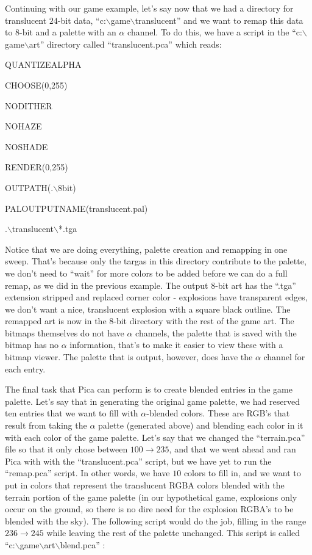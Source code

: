 Continuing with our game example, let's say now that we had a directory for translucent
$24$-bit data, ``c:$\backslash$game$\backslash$translucent'' and we want to remap this data 
to $8$-bit and a palette with an $\alpha$ channel. To do this, we have a script in the 
``c:$\backslash$game$\backslash$art'' directory called ``translucent.pca'' which reads:


QUANTIZEALPHA


CHOOSE(0,255)


NODITHER


NOHAZE


NOSHADE


RENDER(0,255)


OUTPATH(.$\backslash$8bit)


PALOUTPUTNAME(translucent.pal)


.$\backslash$translucent$\backslash$*.tga


\newpar Notice that we are doing everything, palette creation and remapping in one sweep.
That's because only the targas in this directory contribute to the palette, we don't need
to ``wait'' for more colors to be added before we can do a full remap, as we did in the
previous example. The output $8$-bit art has the ``.tga'' extension stripped and replaced
corner color - explosions have transparent edges, we don't want a nice, translucent
explosion with a square black outline. The remapped art is now in the $8$-bit directory
with the rest of the game art. The bitmaps themselves do not have $\alpha$ channels, the
palette that is saved with the bitmap has no $\alpha$ information, that's to make it 
easier to view these with a bitmap viewer. The palette that is output, however, does have
the $\alpha$ channel for each entry.


\newpar The final task that Pica can perform is to create blended entries in the game
palette. Let's say that in generating the original game palette, we had reserved ten
entries that we want to fill with $\alpha$-blended colors. These are RGB's that result
from taking the $\alpha$ palette (generated above) and blending each color in it with
each color of the game palette. Let's say that we changed the ``terrain.pca'' file so that
it only chose between $100 \rightarrow 235$, and that we went ahead and ran Pica with 
with the ``translucent.pca'' script, but we have yet to run the ``remap.pca'' script. In other
words, we have $10$ colors to fill in, and we want to put in colors that represent
the translucent RGBA colors blended with the terrain portion of the game palette (in our
hypothetical game, explosions only occur on the ground, so there is no dire need for
the explosion RGBA's to be blended with the sky). The following script would do the job,
filling in the range $236\rightarrow 245$ while leaving the rest of the palette unchanged.
This script is called ``c:$\backslash$game$\backslash$art$\backslash$blend.pca'' :


